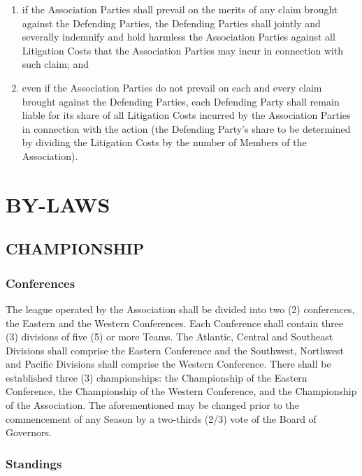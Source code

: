 \documentclass[]{book}
\providecommand{\tightlist}{%
  \setlength{\itemsep}{0pt}\setlength{\parskip}{0pt}}
\begin{document}
\begin{enumerate}
  \begin{enumerate}
  \def\labelenumii{(\roman{enumii})}
  \tightlist
  \item
    if the Association Parties shall prevail on the merits of any claim brought against the Defending Parties, the Defending Parties shall jointly and severally indemnify and hold harmless the Association Parties against all Litigation Costs that the Association Parties may incur in connection with such claim; and
  \item
    even if the Association Parties do not prevail on each and every claim brought against the Defending Parties, each Defending Party shall remain liable for its share of all Litigation Costs incurred by the Association Parties in connection with the action (the Defending Party's share to be determined by dividing the Litigation Costs by the number of Members of the Association).
  \end{enumerate}
\end{enumerate}

\hypertarget{by-laws}{%
\chapter{BY-LAWS}\label{by-laws}}

\hypertarget{championship}{%
\section{CHAMPIONSHIP}\label{championship}}

\hypertarget{conferences}{%
\subsection{Conferences}\label{conferences}}

The league operated by the Association shall be divided into two (2) conferences, the Eastern and the Western Conferences. Each Conference shall contain three (3) divisions of five (5) or more Teams. The Atlantic, Central and Southeast Divisions shall comprise the Eastern Conference and the Southwest, Northwest and Pacific Divisions shall comprise the Western Conference. There shall be established three (3) championships: the Championship of the Eastern Conference, the Championship of the Western Conference, and the Championship of the Association. The aforementioned may be changed prior to the commencement of any Season by a two-thirds (2/3) vote of the Board of Governors.

\hypertarget{standings}{%
\subsection{Standings}\label{standings}}
\end{document}
